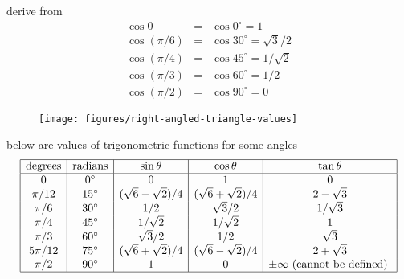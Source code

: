 \documentclass[17pt,landscape]{foils}
\begin{document}
{{

\bit
\item
	derive from 
	\begin{eqnarray*}
		\cos 0 &=& \cos 0^\circ = 1
		\\
		\cos ({\pi}/{6}) &=& \cos 30^\circ = \sqrt{3}/2
		\\
		\cos ({\pi}/{4}) &=& \cos 45^\circ = 1/\sqrt{2}
		\\
		\cos ({\pi}/{3}) &=& \cos 60^\circ = {1}/{2}
		\\
		\cos ({\pi}/{2}) &=& \cos 90^\circ = 0
	\end{eqnarray*}
\eit

\begin{figure}
\begin{center}
	\texttt{[image: figures/right-angled-triangle-values]}
	\label{fig:triangles for special values of cos}
\end{center}
\end{figure}



\bit
\item
	below are values of trigonometric functions
	for some angles
	\[
	\begin{array}{|c|c|c|c|c|}
		\hline
		\mbox{degrees} & \mbox{radians} & \sin\theta & \cos\theta & \tan\theta
		\\
		\hline
		0 & 0^\circ & 0 & 1 & 0
		\\
		\pi/12 & 15^\circ & (\sqrt{6} - \sqrt{2})/4 & (\sqrt{6}+\sqrt{2})/4 & 2-\sqrt{3}
		\\
		\pi/6 & 30^\circ & 1/2 & \sqrt{3}/2 & 1/\sqrt{3}
		\\
		\pi/4 & 45^\circ & 1/\sqrt{2} & 1/\sqrt{2} & 1
		\\
		\pi/3 & 60^\circ & \sqrt{3}/2 & 1/2 & \sqrt{3}
		\\
		5\pi/12 & 75^\circ & (\sqrt{6} + \sqrt{2})/4 & (\sqrt{6}-\sqrt{2})/4 & 2+\sqrt{3}
		\\
		\pi/2 & 90^\circ & 1 & 0 & \pm \infty\mbox{ (cannot be defined)
		}
		\\
		\hline
	\end{array}
	\]

}}
\end{document}
